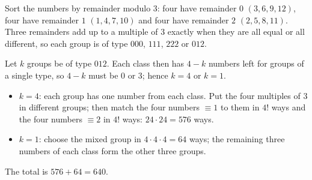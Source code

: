 Sort the numbers by remainder modulo $3$: four have remainder $0$ $(3,6,9,12)$, four have remainder $1$ $(1,4,7,10)$ and four have remainder $2$ $(2,5,8,11)$. Three remainders add up to a multiple of $3$ exactly when they are all equal or all different, so each group is of type $000$, $111$, $222$ or $012$.

Let $k$ groups be of type $012$. Each class then has $4-k$ numbers left for groups of a single type, so $4-k$ must be $0$ or $3$; hence $k=4$ or $k=1$.
\begin{itemize}
\item $k=4$: each group has one number from each class. Put the four multiples of $3$ in different groups; then match the four numbers $\equiv1$ to them in $4!$ ways and the four numbers $\equiv2$ in $4!$ ways: $24\cdot24=576$ ways.
\item $k=1$: choose the mixed group in $4\cdot4\cdot4=64$ ways; the remaining three numbers of each class form the other three groups.
\end{itemize}
The total is $576+64=\boxed{640}$.
